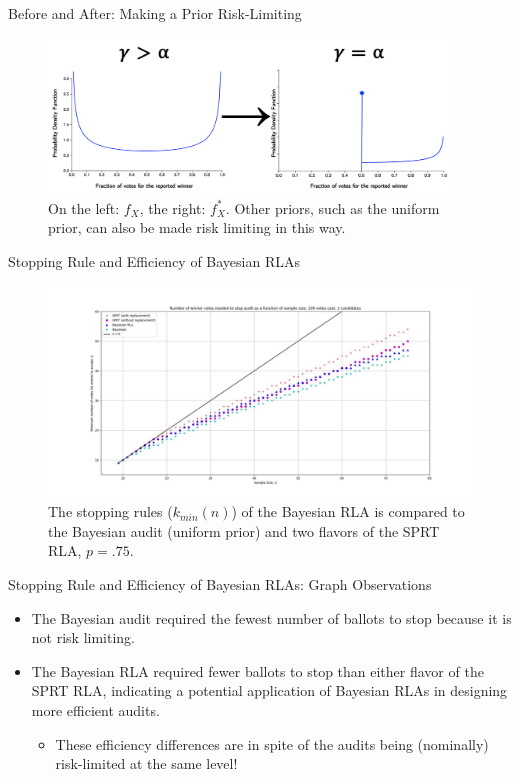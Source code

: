\documentclass{beamer}
\begin{document}
\begin{frame}{Before and After: Making a Prior Risk-Limiting}
\begin{figure}
    \centering
    \includegraphics[width=300pt]{BRLA_Prior.png}
    \caption{On the left: $f_X$, the right: $f_X^*$. Other priors, such as the uniform prior, can also be made risk limiting in this way.}
    \label{fig:my_label}
\end{figure}
\end{frame}

\begin{frame}{Stopping Rule and Efficiency of Bayesian RLAs}
\begin{figure}
    \centering
    \includegraphics[width=320pt]{RLA_vs_Bayesian2.pdf}
    \caption{The stopping rules ($k_{min}(n)$) of the Bayesian RLA is compared to the Bayesian audit (uniform prior) and two flavors of the SPRT RLA, $p = .75$.}
    \label{fig:my_label}
\end{figure}
\end{frame}

\begin{frame}{Stopping Rule and Efficiency of Bayesian RLAs: Graph Observations}
\begin{itemize}
    \item The Bayesian audit required the fewest number of ballots to stop because it is not risk limiting.
    \vskip 1cm
    \item The Bayesian RLA required fewer ballots to stop than either flavor of the SPRT RLA, indicating a potential application of Bayesian RLAs in designing more efficient audits.
    \begin{itemize}
        \item These efficiency differences are in spite of the audits being (nominally) risk-limited at the same level!
    \end{itemize}
\end{itemize}
\end{frame}
\end{document}
